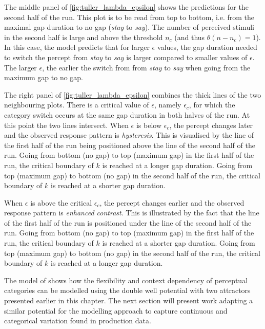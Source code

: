 The middle panel of \ref{fig:tuller_lambda_epsilon} shows the predictions for the second half of the run. This plot is to be read from top to bottom, i.e. from the maximal gap duration to no gap (\emph{stay} to \emph{say}). The number of perceived stimuli in the second half is large and above the threshold $n_c$ (and thus $\theta(n-n_c) = 1$). In this case, the model predicts that for larger $\epsilon$ values, the gap duration needed to switch the percept from \emph{stay} to \emph{say} is larger compared to smaller values of $\epsilon$. The larger $\epsilon$, the earlier the switch from from \emph{stay} to \emph{say} when going from the maximum gap to no gap.

The right panel of \ref{fig:tuller_lambda_epsilon} combines the thick lines of the two neighbouring plots. There is a critical value of $\epsilon$, namely $\epsilon_c$, for which the category switch occurs at the same gap duration in both halves of the run. At this point the two lines intersect. When $\epsilon$ is below $\epsilon_c$, the percept changes later and the observed response pattern is \emph{hysteresis}. This is visualised by the line of the first half of the run being positioned above the line of the second half of the run. Going from bottom (no gap) to top (maximum gap) in the first half of the run, the critical boundary of $k$ is reached at a longer gap duration. Going from top (maximum gap) to bottom (no gap) in the second half of the run, the critical boundary of $k$ is reached at a shorter gap duration. 

When $\epsilon$ is above the critical $\epsilon_c$, the percept changes earlier and the observed response pattern is \emph{enhanced contrast}. This is illustrated by the fact that the line of the first half of the run  is positioned under the line of the second half of the run. Going from bottom (no gap) to top (maximum gap) in the first half of the run, the critical boundary of $k$ is reached at a shorter gap duration. Going from top (maximum gap) to bottom (no gap) in the second half of the run, the critical boundary of $k$ is reached at a longer gap duration.



The model of \citet{Tulleretal1994} shows how the flexibility and context dependency of perceptual categories can be modelled using the double well potential with two attractors presented earlier in this chapter. The next section will present work adapting a similar potential for the modelling approach to capture continuous and categorical variation found in production data.

